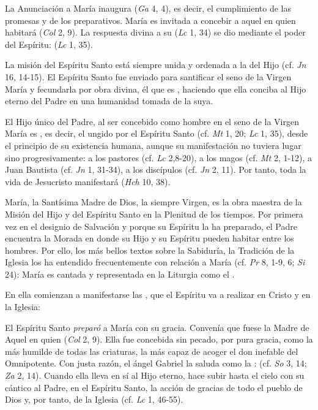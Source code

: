  La Anunciación a María inaugura  (\emph{Ga} 4, 4), es decir, el cumplimiento de las promesas y de los preparativos. María es invitada a concebir a aquel en quien habitará  (\emph{Col} 2, 9). La respuesta divina a su  (\emph{Lc} 1, 34) se dio mediante el poder del Espíritu:  (\emph{Lc} 1, 35).

 La misión del Espíritu Santo está siempre unida y ordenada a la del Hijo (cf. \emph{Jn} 16, 14-15). El Espíritu Santo fue enviado para santificar el seno de la Virgen María y fecundarla por obra divina, él que es , haciendo que ella conciba al Hijo eterno del Padre en una humanidad tomada de la suya.

 El Hijo único del Padre, al ser concebido como hombre en el seno de la Virgen María es , es decir, el ungido por el Espíritu Santo (cf. \emph{Mt} 1, 20; \emph{Lc} 1, 35), desde el principio de su existencia humana, aunque su manifestación no tuviera lugar sino progresivamente: a los pastores (cf. \emph{Lc} 2,8-20), a los magos (cf. \emph{Mt} 2, 1-12), a Juan Bautista (cf. \emph{Jn} 1, 31-34), a los discípulos (cf. \emph{Jn} 2, 11). Por tanto, toda la vida de Jesucristo manifestará  (\emph{Hch} 10, 38).


 María, la Santísima Madre de Dios, la siempre Virgen, es la obra maestra de la Misión del Hijo y del Espíritu Santo en la Plenitud de los tiempos. Por primera vez en el designio de Salvación y porque su Espíritu la ha preparado, el Padre encuentra la Morada en donde su Hijo y su Espíritu pueden habitar entre los hombres. Por ello, los más bellos textos sobre la Sabiduría, la Tradición de la Iglesia los ha entendido frecuentemente con relación a María (cf. \emph{Pr} 8, 1-9, 6; \emph{Si} 24): María es cantada y representada en la Liturgia como el .

En ella comienzan a manifestarse las , que el Espíritu va a realizar en Cristo y en la Iglesia:

 El Espíritu Santo \emph{preparó} a María con su gracia. Convenía que fuese  la Madre de Aquel en quien  (\emph{Col} 2, 9). Ella fue concebida sin pecado, por pura gracia, como la más humilde de todas las criaturas, la más capaz de acoger el don inefable del Omnipotente. Con justa razón, el ángel Gabriel la saluda como la :  (cf. \emph{So} 3, 14; \emph{Za} 2, 14). Cuando ella lleva en sí al Hijo eterno, hace subir hasta el cielo con su cántico al Padre, en el Espíritu Santo, la acción de gracias de todo el pueblo de Dios y, por tanto, de la Iglesia (cf. \emph{Lc} 1, 46-55).

